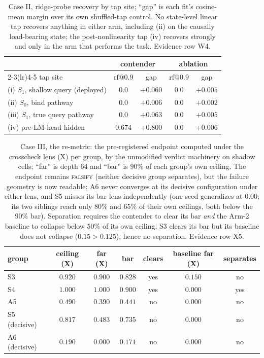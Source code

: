 \documentclass{article}
\makeatletter
\newcommand{\rf}{\mathrm{rf}@0.9}
\makeatother
\begin{document}
\begin{table}[H]
\centering
\footnotesize
\begin{tabular}{@{}lcccc@{}}
\toprule
& \multicolumn{2}{c}{contender} & \multicolumn{2}{c}{ablation} \\
\cmidrule(lr){2-3}\cmidrule(lr){4-5}
tap site & $\rf$ & gap & $\rf$ & gap \\
\midrule
(i) $S_1$, shallow query (deployed) & $0.0$ & $+0.060$ & $0.0$ & $+0.005$ \\
(ii) $S_0$, bind pathway & $0.0$ & $+0.006$ & $0.0$ & $+0.002$ \\
(iii) $S_1$, true query pathway & $0.0$ & $+0.063$ & $0.0$ & $+0.005$ \\
(iv) pre-LM-head hidden & $\mathbf{0.674}$ & $\mathbf{+0.800}$ & $0.0$ & $+0.006$ \\
\bottomrule
\end{tabular}
\caption{Case II, ridge-probe recovery by tap site; ``gap'' is each
fit's cosine-mean margin over its own shuffled-tap control. No
state-level linear tap recovers anything in either arm, including (ii)
on the causally load-bearing state; the post-nonlinearity tap (iv)
recovers strongly and only in the arm that performs the task. Evidence
row W4.}
\label{tab:taps}
\end{table}

\begin{table}[H]
\centering
\footnotesize
\begin{tabular}{@{}lcccccc@{}}
\toprule
group & ceiling (X) & far (X) & bar & clears & baseline far (X) & separates \\
\midrule
S3 & $0.920$ & $0.900$ & $0.828$ & yes & $0.150$ & no \\
S4 & $1.000$ & $1.000$ & $0.900$ & yes & $0.000$ & yes \\
A5 & $0.490$ & $0.390$ & $0.441$ & no & $0.000$ & no \\
S5 (decisive) & $0.817$ & $0.483$ & $0.735$ & no & $0.000$ & no \\
A6 (decisive) & $0.190$ & $0.000$ & $0.171$ & no & $0.000$ & no \\
\bottomrule
\end{tabular}
\caption{Case III, the re-metric: the pre-registered endpoint computed
under the crosscheck lens (X) per group, by the unmodified verdict
machinery on shadow cells; ``far'' is depth 64 and ``bar'' is $90\%$
of each group's own ceiling. The endpoint remains \textsc{falsify}
(neither decisive group separates), but the failure geometry is now
readable: A6 never converges at its decisive configuration under
either lens, and S5 misses its bar lens-independently (one seed
generalizes at $0.00$; its two siblings reach only $80\%$ and $65\%$
of their own ceilings, both below the $90\%$ bar). Separation
requires the contender to clear its bar \emph{and} the Arm-2 baseline
to collapse below $50\%$ of its own ceiling; S3 clears its bar but
its baseline does not collapse ($0.15>0.125$), hence no separation.
Evidence row X5.}
\label{tab:remetric}
\end{table}
\end{document}
